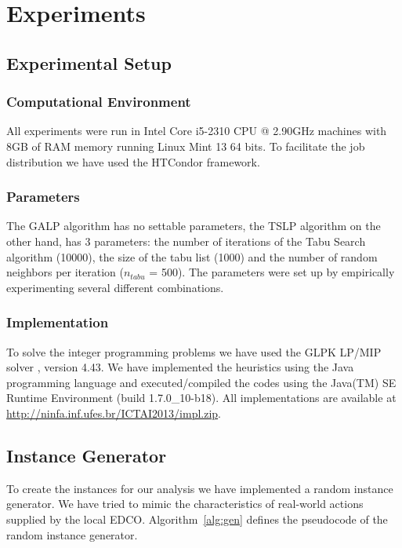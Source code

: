 \section{Experiments}
\label{sec:exp}

\subsection{Experimental Setup}
\subsubsection{Computational Environment}
All experiments were run in Intel Core i5-2310 CPU @ 2.90GHz machines
with 8GB of RAM memory running Linux Mint 13 64 bits.  To facilitate the job distribution we have used the HTCondor framework.

\subsubsection{Parameters}
The GALP algorithm has no settable parameters, the TSLP algorithm on the other hand,
has 3 parameters: the number of iterations of the Tabu Search algorithm (10000),
the size of the tabu list (1000) and the number of random neighbors per iteration
($n_{tabu}$ = 500).
The parameters were set up by empirically experimenting several different combinations.

\subsubsection{Implementation}
To solve the integer programming problems we have used the GLPK LP/MIP solver \cite{GLPK},
version 4.43. We have implemented the heuristics using the Java programming language and
executed/compiled the codes using the Java(TM) SE Runtime Environment (build 1.7.0\_10-b18).
All implementations are available at \url{http://ninfa.inf.ufes.br/ICTAI2013/impl.zip}. 

\subsection{Instance Generator}
To create the instances for our analysis we have implemented a random instance generator.
We have tried to mimic the characteristics of real-world actions supplied by the local EDCO.
Algorithm~\ref{alg:gen} defines the pseudocode of the random instance generator.

